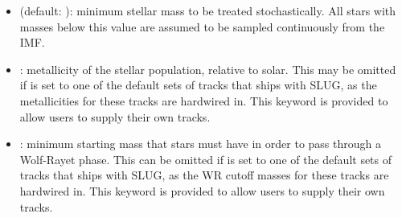 \documentclass[letterpaper,10pt,english]{sphinxmanual}
\begin{document}
\begin{itemize}
\item {} 
 (default: ): minimum stellar mass to be treated stochastically. All stars with masses below this value are assumed to be sampled continuously from the IMF.

\item {} 
: metallicity of the stellar population, relative to solar. This may be omitted if  is set to one of the default sets of tracks that ships with SLUG, as the metallicities for these tracks are hardwired in. This keyword is provided to allow users to supply their own tracks.

\item {} 
: minimum starting mass that stars must have in order to pass through a Wolf-Rayet phase. This can be omitted if  is set to one of the default sets of tracks that ships with SLUG, as the WR cutoff masses for these tracks are hardwired in. This keyword is provided to allow users to supply their own tracks.

\end{itemize}
\end{document}
